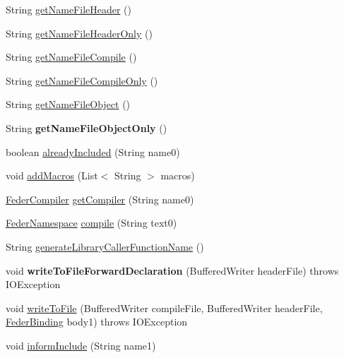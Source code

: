 \begin{DoxyCompactItemize}
\item 
String \hyperlink{classfeder_1_1FederCompiler_af56778dff690131320aaa2b7b8d1b8fb}{get\+Name\+File\+Header} ()
\item 
String \hyperlink{classfeder_1_1FederCompiler_ae130cb8cd6fa40d714dfa314d97243dd}{get\+Name\+File\+Header\+Only} ()
\item 
String \hyperlink{classfeder_1_1FederCompiler_a0cfbca0eeb6cccdb953d1f4232aba37e}{get\+Name\+File\+Compile} ()
\item 
String \hyperlink{classfeder_1_1FederCompiler_a01b3fa2b74ccce828f5afa1792d2b4a0}{get\+Name\+File\+Compile\+Only} ()
\item 
String \hyperlink{classfeder_1_1FederCompiler_a1c4f7b541e25baae015492afcbb96965}{get\+Name\+File\+Object} ()
\item 
\mbox{\label{classfeder_1_1FederCompiler_ac798ce8c56d635322cc10a64a4ba9235}} 
String {\bfseries get\+Name\+File\+Object\+Only} ()
\item 
boolean \hyperlink{classfeder_1_1FederCompiler_a33c8a6aab78bef99df17306c9a3e9c95}{already\+Included} (String name0)
\item 
void \hyperlink{classfeder_1_1FederCompiler_aac12b9b09fb8a5a0caaf62e021bbeae7}{add\+Macros} (List$<$ String $>$ macros)
\item 
\hyperlink{classfeder_1_1FederCompiler}{Feder\+Compiler} \hyperlink{classfeder_1_1FederCompiler_a84f29a6bcfa849ab97b0aed77e1008c3}{get\+Compiler} (String name0)
\item 
\hyperlink{classfeder_1_1types_1_1FederNamespace}{Feder\+Namespace} \hyperlink{classfeder_1_1FederCompiler_adfef64d211b87229b254e05144d00caf}{compile} (String text0)
\item 
String \hyperlink{classfeder_1_1FederCompiler_ab3314b260330e1ce37132849bcb50b75}{generate\+Library\+Caller\+Function\+Name} ()
\item 
\mbox{\label{classfeder_1_1FederCompiler_af2cb36b66498704682c6b3eb4ea99f63}} 
void {\bfseries write\+To\+File\+Forward\+Declaration} (Buffered\+Writer header\+File)  throws I\+O\+Exception 	
\item 
void \hyperlink{classfeder_1_1FederCompiler_a4e72abbcf700edf0f31ce2aea2605cb9}{write\+To\+File} (Buffered\+Writer compile\+File, Buffered\+Writer header\+File, \hyperlink{classfeder_1_1types_1_1FederBinding}{Feder\+Binding} body1)  throws I\+O\+Exception 	
\item 
void \hyperlink{classfeder_1_1FederCompiler_a11c62c5eaf76b4a8e1b994981cb88ff3}{inform\+Include} (String name1)
\end{DoxyCompactItemize}
